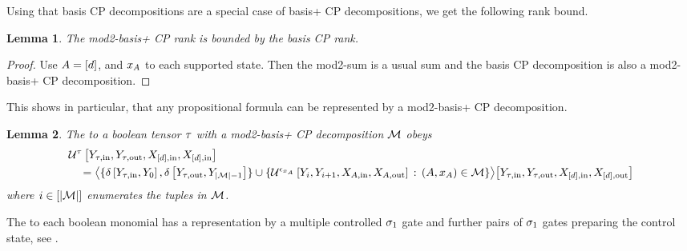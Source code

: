 \documentclass[aps,onecolumn,nofootinbib,pra]{article}
\newtheorem{lemma}{Lemma}
\begin{document}
    Using that basis CP decompositions are a special case of basis+ CP decompositions, we get the following rank bound.

    \begin{lemma}
        The mod2-basis+ CP rank is bounded by the basis CP rank.
    \end{lemma}
    \begin{proof}
        Use $A=[d]$, and $x_{A}$ to each supported state.
        Then the mod2-sum is a usual sum and the basis CP decomposition is also a mod2-basis+ CP decomposition.
    \end{proof}

    This shows in particular, that any propositional formula can be represented by a mod2-basis+ CP decomposition.

    \begin{lemma}
        The \computationCircuit{} to a boolean tensor $\tau$ with a mod2-basis+ CP decomposition $\mathcal{M}$ obeys
        \begin{align*}
            &\mathcal{U}^{\tau}\left[
                Y_{\tau,\mathrm{in}},Y_{\tau,\mathrm{out}},X_{[d],\mathrm{in}},X_{[d],\mathrm{in}}
            \right] \\
            & \quad =
            \big\langle 
                \{\delta\left[Y_{\tau,\mathrm{in}},Y_{0}\right],\delta\left[Y_{\tau,\mathrm{out}},Y_{\left|\mathcal{M}\right|-1}\right]\} \cup
                \{\mathcal{U}^{\epsilon_{x_{A}}}\left[
                Y_{i}, Y_{i+1},
                X_{A,\mathrm{in}},X_{A,\mathrm{out}}\right] \,:\, (A,x_{A})\in\mathcal{M}\}
             \big\rangle \big[ Y_{\tau,\mathrm{in}},Y_{\tau,\mathrm{out}},X_{[d],\mathrm{in}},X_{[d],\mathrm{out}} \big]
        \end{align*}
        where $i\in[\left|\mathcal{M}\right|]$ enumerates the tuples in $\mathcal{M}$.
    \end{lemma}

    The \computationCircuit{} to each boolean monomial has a representation by a multiple controlled $\sigma_1$ gate and further pairs of $\sigma_1$ gates preparing the control state, see .
\end{document}
